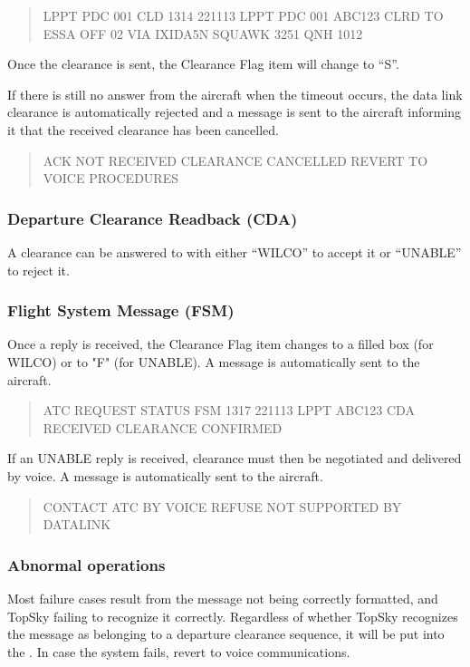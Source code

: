 \documentclass[a4paper,oneside,11pt]{memoir}
\begin{document}
\begin{quote}
  LPPT PDC 001 CLD 1314 221113 LPPT PDC 001 ABC123 CLRD TO ESSA OFF 02 VIA IXIDA5N SQUAWK 3251 QNH 1012
\end{quote}

Once the clearance is sent, the Clearance Flag item will change to “S”.

\bigskip

If there is still no answer from the aircraft when the timeout occurs, the data link clearance is automatically rejected and a message is sent to the aircraft informing it that the received clearance has been cancelled.

\begin{quote}
  ACK NOT RECEIVED CLEARANCE CANCELLED REVERT TO VOICE PROCEDURES
\end{quote}

\subsubsection{Departure Clearance Readback (CDA)}

A clearance can be answered to with either “WILCO” to accept it or “UNABLE” to reject it.

\subsubsection{Flight System Message (FSM)}

Once a reply is received, the Clearance Flag item changes to a filled box (for WILCO) or to "F" (for UNABLE). A message is automatically sent to the aircraft.

\begin{quote}
  ATC REQUEST STATUS FSM 1317 221113 LPPT ABC123 CDA RECEIVED CLEARANCE CONFIRMED 
\end{quote}

If an UNABLE reply is received, clearance must then be negotiated and delivered by voice. A message is automatically sent to the aircraft.

\begin{quote}
  CONTACT ATC BY VOICE REFUSE NOT SUPPORTED BY DATALINK
\end{quote}

\subsubsection{Abnormal operations}

Most failure cases result from the message not being correctly formatted, and TopSky failing to recognize it correctly. Regardless of whether TopSky recognizes the message as belonging to a departure clearance sequence, it will be put into the . In case the system fails, revert to voice communications.
\end{document}
